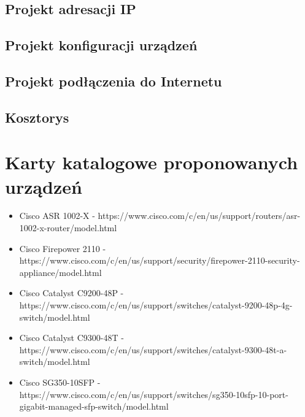 \documentclass[12pt,a4paper]{article}
\begin{document}
	\subsection{Projekt adresacji IP}
	    
	\subsection{Projekt konfiguracji urządzeń}
	
	\subsection{Projekt podłączenia do Internetu}
	
	\subsection{Kosztorys}
	
	\section{Karty katalogowe proponowanych urządzeń}
	
	\begin{itemize}
		\item Cisco ASR 1002-X - https://www.cisco.com/c/en/us/support/routers/asr-1002-x-router/model.html
		\item Cisco Firepower 2110 - https://www.cisco.com/c/en/us/support/security/firepower-2110-security-appliance/model.html
		\item Cisco Catalyst C9200-48P - https://www.cisco.com/c/en/us/support/switches/catalyst-9200-48p-4g-switch/model.html
		\item Cisco Catalyst C9300-48T - https://www.cisco.com/c/en/us/support/switches/catalyst-9300-48t-a-switch/model.html
		\item Cisco SG350-10SFP - https://www.cisco.com/c/en/us/support/switches/sg350-10sfp-10-port-gigabit-managed-sfp-switch/model.html
	\end{itemize}
	
\end{document}
